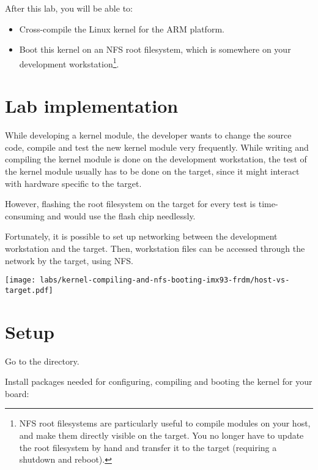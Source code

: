
After this lab, you will be able to:
\begin{itemize}

\item Cross-compile the Linux kernel for the ARM platform.

\item Boot this kernel on an NFS root filesystem, which is somewhere
on your development workstation\footnote{NFS root filesystems are
particularly useful to compile modules on your host, and make them
directly visible on the target. You no longer have to update the root
filesystem by hand and transfer it to the target (requiring a shutdown
and reboot).}.

\end{itemize}

\section{Lab implementation}

While developing a kernel module, the developer wants to change the
source code, compile and test the new kernel module very
frequently. While writing and compiling the kernel module is done on the
development workstation, the test of the kernel module usually has to
be done on the target, since it might interact with hardware specific
to the target.

However, flashing the root filesystem on the target for every test is
time-consuming and would use the flash chip needlessly.

Fortunately, it is possible to set up networking between the
development workstation and the target. Then, workstation files can be
accessed through the network by the target, using NFS.

\begin{center}
\texttt{[image: labs/kernel-compiling-and-nfs-booting-imx93-frdm/host-vs-target.pdf]}
\end{center}

\section{Setup}

Go to the  directory.

Install packages needed for configuring, compiling and booting
the kernel for your board:

